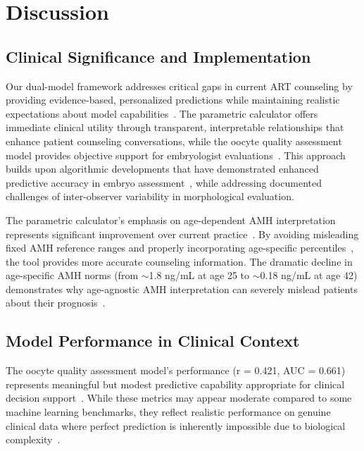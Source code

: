 \section{Discussion}\label{sec:discussion}

\subsection{Clinical Significance and Implementation}

Our dual-model framework addresses critical gaps in current ART counseling by providing evidence-based, personalized predictions while maintaining realistic expectations about model capabilities~\cite{gameiro2023understanding,asrm2021counselors}. The parametric calculator offers immediate clinical utility through transparent, interpretable relationships that enhance patient counseling conversations, while the oocyte quality assessment model provides objective support for embryologist evaluations~\cite{paternot2009observer,paternot2011multicentre,fordham2022embryologist}. This approach builds upon algorithmic developments that have demonstrated enhanced predictive accuracy in embryo assessment~\cite{rave2024bonna}, while addressing documented challenges of inter-observer variability in morphological evaluation.

The parametric calculator's emphasis on age-dependent AMH interpretation represents significant improvement over current practice~\cite{ovarian_reserve_testing}. By avoiding misleading fixed AMH reference ranges and properly incorporating age-specific percentiles~\cite{lee2017amh,song2021amh}, the tool provides more accurate counseling information. The dramatic decline in age-specific AMH norms (from $\sim$1.8 ng/mL at age 25 to $\sim$0.18 ng/mL at age 42) demonstrates why age-agnostic AMH interpretation can severely mislead patients about their prognosis~\cite{lee2017amh}.

\subsection{Model Performance in Clinical Context}

The oocyte quality assessment model's performance (r = 0.421, AUC = 0.661) represents meaningful but modest predictive capability appropriate for clinical decision support~\cite{varoquaux2022machine,rajkomar2019machine}. While these metrics may appear moderate compared to some machine learning benchmarks, they reflect realistic performance on genuine clinical data where perfect prediction is inherently impossible due to biological complexity~\cite{litjens2017survey}.

